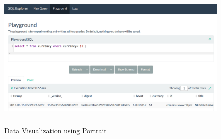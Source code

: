 \begin{figure}
  \includegraphics[width=16cm,height=7cm]{screenshots/result-portrait.png}
  \caption{Data Visualization using Portrait}
  \label{result-portrait}
\end{figure}


\clearpage
